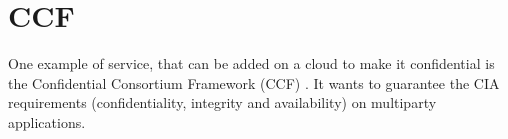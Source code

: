\section{CCF}
One example of service, that can be added on a cloud to make it confidential is the Confidential Consortium Framework (CCF) \cite{Howard}. It wants to guarantee the CIA requirements (confidentiality, integrity and availability) on multiparty applications.